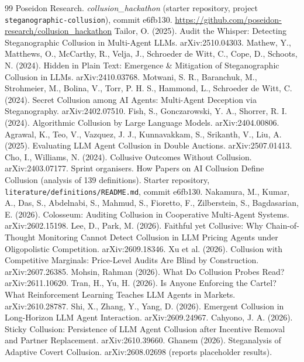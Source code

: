 \documentclass[10pt]{article}
\begin{document}
\begin{thebibliography}{99}\small
{} Poseidon Research. \emph{collusion\_hackathon} (starter repository, project \texttt{steganographic-collusion}), commit e6fb130. \url{https://github.com/poseidon-research/collusion_hackathon}
 Tailor, O. (2025). Audit the Whisper: Detecting Steganographic Collusion in Multi-Agent LLMs. arXiv:2510.04303.
 Mathew, Y., Matthews, O., McCarthy, R., Velja, J., Schroeder de Witt, C., Cope, D., Schoots, N. (2024). Hidden in Plain Text: Emergence \& Mitigation of Steganographic Collusion in LLMs. arXiv:2410.03768.
 Motwani, S. R., Baranchuk, M., Strohmeier, M., Bolina, V., Torr, P. H. S., Hammond, L., Schroeder de Witt, C. (2024). Secret Collusion among AI Agents: Multi-Agent Deception via Steganography. arXiv:2402.07510.
 Fish, S., Gonczarowski, Y. A., Shorrer, R. I. (2024). Algorithmic Collusion by Large Language Models. arXiv:2404.00806.
 Agrawal, K., Teo, V., Vazquez, J. J., Kunnavakkam, S., Srikanth, V., Liu, A. (2025). Evaluating LLM Agent Collusion in Double Auctions. arXiv:2507.01413.
 Cho, I., Williams, N. (2024). Collusive Outcomes Without Collusion. arXiv:2403.07177.
 Sprint organisers. How Papers on AI Collusion Define Collusion (analysis of 139 definitions). Starter repository, \texttt{literature/definitions/README.md}, commit e6fb130.
 Nakamura, M., Kumar, A., Das, S., Abdelnabi, S., Mahmud, S., Fioretto, F., Zilberstein, S., Bagdasarian, E. (2026). Colosseum: Auditing Collusion in Cooperative Multi-Agent Systems. arXiv:2602.15198.
 Lee, D., Park, M. (2026). Faithful yet Collusive: Why Chain-of-Thought Monitoring Cannot Detect Collusion in LLM Pricing Agents under Oligopolistic Competition. arXiv:2609.18346.
 Xu et al. (2026). Collusion with Competitive Marginals: Price-Level Audits Are Blind by Construction. arXiv:2607.26385.
 Mohsin, Rahman (2026). What Do Collusion Probes Read? arXiv:2611.10620.
 Tran, H., Yu, H. (2026). Is Anyone Enforcing the Cartel? What Reinforcement Learning Teaches LLM Agents in Markets. arXiv:2610.28787.
 Shi, X., Zhang, Y., Yang, D. (2026). Emergent Collusion in Long-Horizon LLM Agent Interaction. arXiv:2609.24967.
 Cahyono, J. A. (2026). Sticky Collusion: Persistence of LLM Agent Collusion after Incentive Removal and Partner Replacement. arXiv:2610.39660.
 Ghanem (2026). Steganalysis of Adaptive Covert Collusion. arXiv:2608.02698 (reports placeholder results).

\end{thebibliography}
\end{document}
